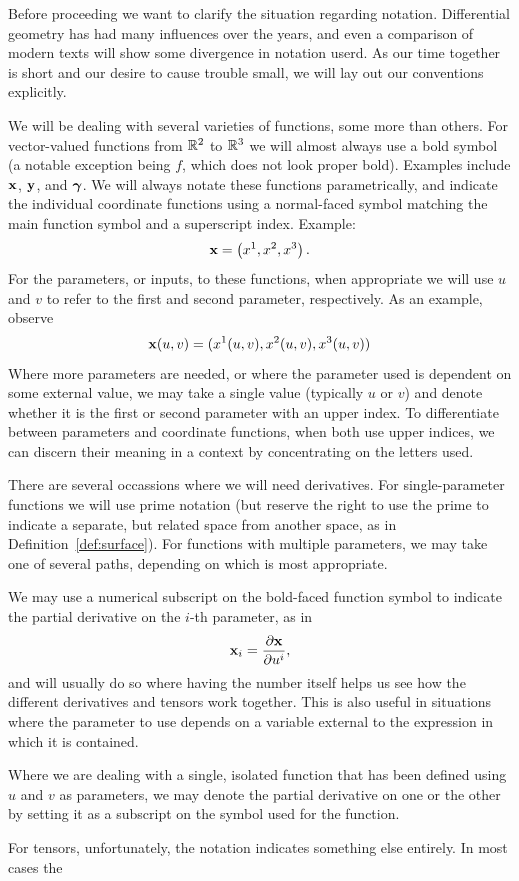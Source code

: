   \begin{unno_rem}
    Before proceeding we want to clarify the situation regarding notation. Differential geometry has had many influences over the years, and even a comparison of modern texts will show some divergence in notation userd. As our time together is short and our desire to cause trouble small, we will lay out our conventions explicitly.

    We will be dealing with several varieties of functions, some more than others. For vector-valued functions from $\mathbb{R}^2$ to $\mathbb{R}^3$ we will almost always use a bold symbol (a notable exception being $f$, which does not look proper bold). Examples include $\mathbf{x}$, $\mathbf{y}$, and $\boldsymbol{\gamma}$. We will always notate these functions parametrically, and indicate the individual coordinate functions using a normal-faced symbol matching the main function symbol and a superscript index. Example:
    \[
      \mathbf{x} = \left(x^1, x^2, x^3\right).
    \]
    For the parameters, or inputs, to these functions, when appropriate we will use $u$ and $v$ to refer to the first and second parameter, respectively. As an example, observe
    \[
      \mathbf{x}(u, v) = (x^1(u, v), x^2(u, v), x^3(u, v))
    \]
    Where more parameters are needed, or where the parameter used is dependent on some external value, we may take a single value (typically $u$ or $v$) and denote whether it is the first or second parameter with an upper index. To differentiate between parameters and coordinate functions, when both use upper indices, we can discern their meaning in a context by concentrating on the letters used. 

    There are several occassions where we will need derivatives. For single-parameter functions we will use prime notation (but reserve the right to use the prime to indicate a separate, but related space from another space, as in Definition~\ref{def:surface}). For functions with multiple parameters, we may take one of several paths, depending on which is most appropriate.

    We may use a numerical subscript on the bold-faced function symbol to indicate the partial derivative on the $i$-th parameter, as in 
    \[
      \mathbf{x}_i = \frac{\partial \mathbf{x}}{\partial u^i},
    \]
    and will usually do so where having the number itself helps us see how the different derivatives and tensors work together. This is also useful in situations where the parameter to use depends on a variable external to the expression in which it is contained.

    Where we are dealing with a single, isolated function that has been defined using $u$ and $v$ as parameters, we may denote the partial derivative on one or the other by setting it as a subscript on the symbol used for the function.

    For tensors, unfortunately, the notation indicates something else entirely. In most cases the 
  \end{unno_rem}

